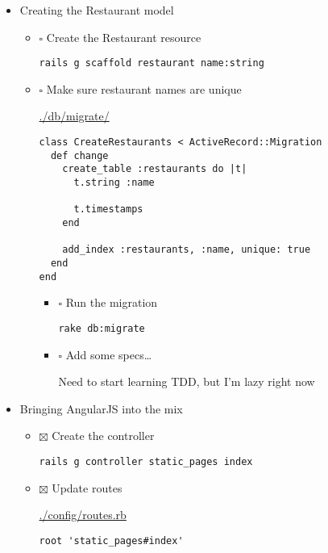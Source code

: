 \documentclass[11pt]{article}
\begin{document}
\begin{itemize}
\begin{itemize}
\item Creating the Restaurant model
\label{sec-1-3-3-1-0-2}

\begin{itemize}
\item $\square$ Create the Restaurant resource

\begin{verbatim}
rails g scaffold restaurant name:string
\end{verbatim}

\item $\square$ Make sure restaurant names are unique

\url{./db/migrate/}

\begin{verbatim}
class CreateRestaurants < ActiveRecord::Migration
  def change
    create_table :restaurants do |t|
      t.string :name

      t.timestamps
    end

    add_index :restaurants, :name, unique: true
  end
end
\end{verbatim}

\begin{itemize}
\item $\square$ Run the migration

\begin{verbatim}
rake db:migrate
\end{verbatim}

\item $\square$ Add some specs\ldots{}

Need to start learning TDD, but I'm lazy right now
\end{itemize}
\end{itemize}

\item Bringing AngularJS into the mix
\label{sec-1-3-3-1-0-3}

\begin{itemize}
\item $\boxtimes$ Create the controller

\begin{verbatim}
rails g controller static_pages index
\end{verbatim}

\item $\boxtimes$ Update routes

\url{./config/routes.rb}

\begin{verbatim}
root 'static_pages#index'
\end{verbatim}


\end{itemize}
\end{itemize}
\end{itemize}
\end{document}
